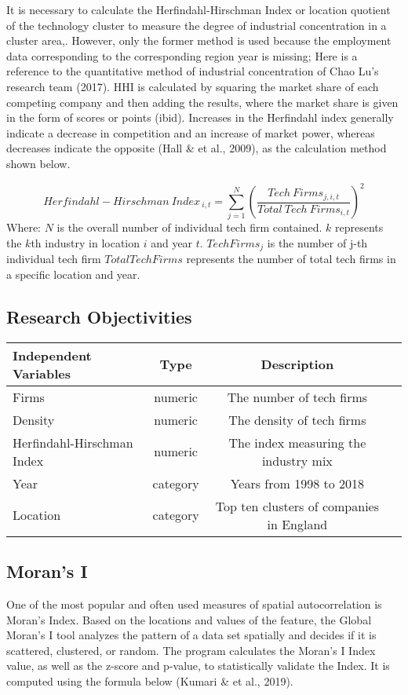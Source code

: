 \documentclass[
  12pt,
  oneside]{book}
\begin{document}
It is necessary to calculate the Herfindahl-Hirschman Index or location quotient of the technology cluster to measure the degree of industrial concentration in a cluster area,. However, only the former method is used because the employment data corresponding to the corresponding region year is missing; Here is a reference to the quantitative method of industrial concentration of Chao Lu's research team (2017). HHI is calculated by squaring the market share of each competing company and then adding the results, where the market share is given in the form of scores or points (ibid). Increases in the Herfindahl index generally indicate a decrease in competition and an increase of market power, whereas decreases indicate the opposite (Hall \& et al., 2009), as the calculation method shown below.

\[ Herfindahl-Hirschman \ Index_{\ i,t} = \sum_{j=1}^N (\frac{Tech\ Firms_{j,i,t}}{Total\ Tech\ Firms_{i,t}})^2 \]
Where:
\(N\) is the overall number of individual tech firm contained.
\(k\) represents the \(k\)th industry in location \(i\) and year \(t\).
\(Tech Firms_j\) is the number of j-th individual tech firm
\(Total Tech Firms\) represents the number of total tech firms in a specific location and year.

\hypertarget{research-objectivities}{%
\subsection{Research Objectivities}\label{research-objectivities}}

\begin{longtable}[]{@{}lccr@{}}
\toprule
Independent Variables & Type & Description &\tabularnewline
\midrule
\endhead
Firms & numeric & The number of tech firms &\tabularnewline
Density & numeric & The density of tech firms &\tabularnewline
Herfindahl-Hirschman Index & numeric & The index measuring the industry mix &\tabularnewline
Year & category & Years from 1998 to 2018 &\tabularnewline
Location & category & Top ten clusters of companies in England &\tabularnewline
\bottomrule
\end{longtable}

\hypertarget{morans-i}{%
\subsection{Moran's I}\label{morans-i}}

One of the most popular and often used measures of spatial autocorrelation is Moran's Index. Based on the locations and values of the feature, the Global Moran's I tool analyzes the pattern of a data set spatially and decides if it is scattered, clustered, or random. The program calculates the Moran's I Index value, as well as the z-score and p-value, to statistically validate the Index. It is computed using the formula below (Kumari \& et al., 2019).
\end{document}
